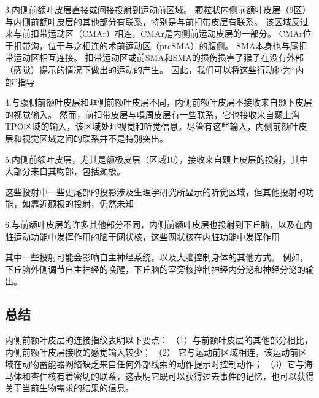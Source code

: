 3.内侧前额叶皮层直接或间接投射到运动前区域。
颗粒状内侧前额叶皮层（9区）与内侧前额叶皮层的其他部分有联系，特别是与前扣带皮层有联系\cite{vogt1987cingulate}。
该区域反过来与前扣带运动区（CMAr）相连，CMAr是内侧前运动皮层的一部分\cite{morecraft1998convergence}。
CMAr位于扣带沟\cite{dum2002motor}，位于与之相连的术前运动区（preSMA）的腹侧\cite{luppino1993corticocortical}。
SMA本身也与尾扣带运动区相互连接\cite{luppino1993corticocortical}。
扣带运动区或前SMA和SMA的损伤损害了猴子在没有外部（感觉）提示的情况下做出的运动的产生\cite{thaler1995functions}。
因此，我们可以将这些行动称为“内部”指导\par


4.与腹侧前额叶皮层和眶侧前额叶皮层不同，内侧前额叶皮层不接收来自颞下皮层的视觉输入\cite{carmichael1995sensory,kondo2005differential}。
然而，前扣带皮层与嗅周皮层有一些联系，它也接收来自颞上沟TPO区域的输入\cite{kondo2005differential}，该区域处理视觉和听觉信息。尽管有这些输入，内侧前额叶皮层和视觉区域之间的联系并不是特别突出。\par


5.内侧前额叶皮层，尤其是额极皮层（区域10），接收来自颞上皮层的投射，其中大部分来自其吻部，包括颞极\cite{barbas1999medial,kondo2003differential}。\par
这些投射中一些更尾部的投影涉及生理学研究所显示的听觉区域\cite{hackett1998subdivisions}，但其他投射的功能，如靠近颞极的投射，仍然未知\par


6.与前额叶皮层的许多其他部分不同，内侧前额叶皮层也投射到下丘脑\cite{rempel1998topographic}，以及在内脏运动功能中发挥作用的脑干网状核，这些网状核在内脏功能中发挥作用\cite{ongur1998prefrontal}\par


其中一些投射可能会影响自主神经系统，以及大脑控制身体的其他方式。
例如，下丘脑外侧调节自主神经的唤醒，下丘脑的室旁核控制神经内分泌和神经分泌的输出。\par



\subsection{总结}

内侧前额叶皮层的连接指纹表明以下要点：
（1）与前额叶皮层的其他部分相比，内侧前额叶皮层接收的感觉输入较少；
（2） 它与运动前区域相连，该运动前区域在动物蓄能器网络缺乏来自任何外部线索的动作提示时控制动作；
（3）它与海马体和杏仁核有着密切的联系，这表明它既可以获得过去事件的记忆，也可以获得关于当前生物需求的结果的信息。\par


